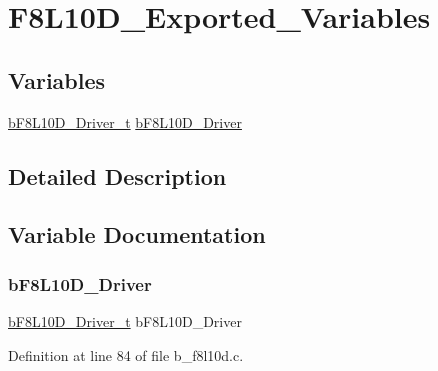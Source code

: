 \hypertarget{group___f8_l10_d___exported___variables}{}\section{F8\+L10\+D\+\_\+\+Exported\+\_\+\+Variables}
\label{group___f8_l10_d___exported___variables}
\subsection*{Variables}
\begin{DoxyCompactItemize}
\item 
\mbox{\hyperlink{group___f8_l10_d___exported___types_definitions_ga8c86a10e36d7c236670aabfbd89c06dd}{b\+F8\+L10\+D\+\_\+\+Driver\+\_\+t}} \mbox{\hyperlink{group___f8_l10_d___exported___variables_ga5afdf2a0e03c7fedf1b1c03ede3350a6}{b\+F8\+L10\+D\+\_\+\+Driver}}
\end{DoxyCompactItemize}


\subsection{Detailed Description}


\subsection{Variable Documentation}
\mbox{\label{group___f8_l10_d___exported___variables_ga5afdf2a0e03c7fedf1b1c03ede3350a6}} 
\subsubsection{\texorpdfstring{b\+F8\+L10\+D\+\_\+\+Driver}{bF8L10D\_Driver}}
{\footnotesize\ttfamily \mbox{\hyperlink{group___f8_l10_d___exported___types_definitions_ga8c86a10e36d7c236670aabfbd89c06dd}{b\+F8\+L10\+D\+\_\+\+Driver\+\_\+t}} b\+F8\+L10\+D\+\_\+\+Driver}



Definition at line 84 of file b\+\_\+f8l10d.\+c.

